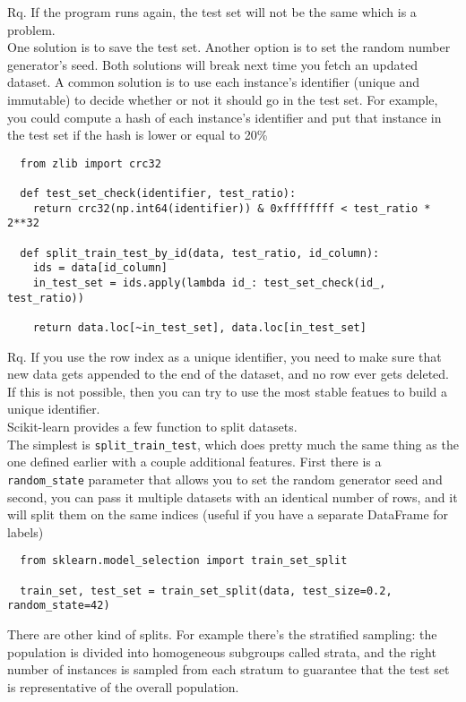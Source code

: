 \documentclass[french]{article}
\begin{document}
Rq. If the program runs again, the test set will not be the same which is a problem.\\
One solution is to save the test set. Another option is to set the random number generator's seed. Both solutions will break next time you fetch an updated dataset. A common solution is to use each instance's identifier (unique and immutable) to decide whether or not it should go in the test set. For example, you could compute a hash of each instance's identifier and put that instance in the test set if the hash is lower or equal to 20\%
\begin{lstlisting}
  from zlib import crc32

  def test_set_check(identifier, test_ratio):
    return crc32(np.int64(identifier)) & 0xffffffff < test_ratio * 2**32

  def split_train_test_by_id(data, test_ratio, id_column):
    ids = data[id_column]
    in_test_set = ids.apply(lambda id_: test_set_check(id_, test_ratio))

    return data.loc[~in_test_set], data.loc[in_test_set]
\end{lstlisting}

Rq. If you use the row index as a unique identifier, you need to make sure that new data gets appended to the end of the dataset, and no row ever gets deleted. If this is not possible, then you can try to use the most stable featues to build a unique identifier.\\

Scikit-learn provides a few function to split datasets. \\The simplest is \verb|split_train_test|, which does pretty much the same thing as the one defined earlier with a couple additional features. First there is a \verb|random_state| parameter that allows you to set the random generator seed and second, you can pass it multiple datasets with an identical number of rows, and it will split them on the same indices (useful if you have a separate DataFrame for labels)


\begin{lstlisting}
  from sklearn.model_selection import train_set_split

  train_set, test_set = train_set_split(data, test_size=0.2, random_state=42)
\end{lstlisting}

There are other kind of splits. For example there's the stratified sampling: the population is divided into homogeneous subgroups called strata, and the right number of instances is sampled from each stratum to guarantee that the test set is representative of the overall population.
\end{document}
